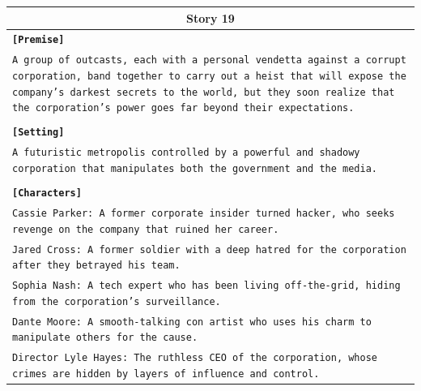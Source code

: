 \documentclass[letterpaper]{article} %
\begin{document}
\begin{small}
\begin{longtable}{p{\textwidth}}
    \multicolumn{1}{c}{\textbf{Story 19}} \\
    \midrule
    \texttt{\textbf{[Premise]}} \\
    \texttt{A group of outcasts, each with a personal vendetta against a corrupt corporation, band together to carry out a heist that will expose the company's darkest secrets to the world, but they soon realize that the corporation's power goes far beyond their expectations.} \\\\
    \texttt{\textbf{[Setting]}} \\
    \texttt{A futuristic metropolis controlled by a powerful and shadowy corporation that manipulates both the government and the media.} \\\\
    \texttt{\textbf{[Characters]}} \\
    \texttt{Cassie Parker: A former corporate insider turned hacker, who seeks revenge on the company that ruined her career.} \\
    \texttt{Jared Cross: A former soldier with a deep hatred for the corporation after they betrayed his team.} \\
    \texttt{Sophia Nash: A tech expert who has been living off-the-grid, hiding from the corporation's surveillance.} \\
    \texttt{Dante Moore: A smooth-talking con artist who uses his charm to manipulate others for the cause.} \\
    \texttt{Director Lyle Hayes: The ruthless CEO of the corporation, whose crimes are hidden by layers of influence and control.} \\
    \midrule
  

\end{longtable}
\end{small}
\end{document}
